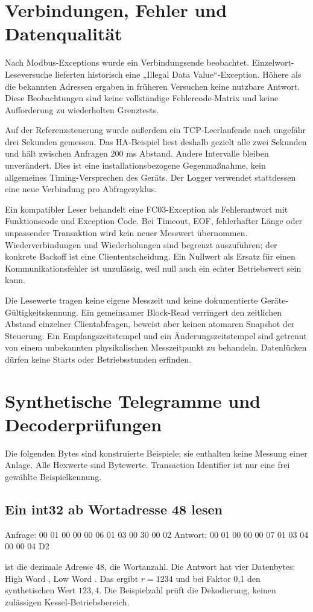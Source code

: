 \documentclass[10pt,a4paper]{article}
\begin{document}
\section{Verbindungen, Fehler und Datenqualität}
Nach Modbus-Exceptions wurde ein Verbindungsende beobachtet. Einzelwort-Leseversuche lieferten historisch eine „Illegal Data Value“-Exception. Höhere als die bekannten Adressen ergaben in früheren Versuchen keine nutzbare Antwort. Diese Beobachtungen sind keine vollständige Fehlercode-Matrix und keine Aufforderung zu wiederholten Grenztests.

Auf der Referenzsteuerung wurde außerdem ein TCP-Leerlaufende nach ungefähr drei Sekunden gemessen. Das HA-Beispiel liest deshalb gezielt  alle zwei Sekunden und hält zwischen Anfragen 200 ms Abstand. Andere Intervalle bleiben unverändert. Dies ist eine installationsbezogene Gegenmaßnahme, kein allgemeines Timing-Versprechen des Geräts. Der Logger verwendet stattdessen eine neue Verbindung pro Abfragezyklus.

Ein kompatibler Leser behandelt eine FC03-Exception als Fehlerantwort mit Funktionscode  und Exception Code. Bei Timeout, EOF, fehlerhafter Länge oder unpassender Transaktion wird kein neuer Messwert übernommen. Wiederverbindungen und Wiederholungen sind begrenzt auszuführen; der konkrete Backoff ist eine Cliententscheidung. Ein Nullwert als Ersatz für einen Kommunikationsfehler ist unzulässig, weil null auch ein echter Betriebswert sein kann.

Die Lesewerte tragen keine eigene Messzeit und keine dokumentierte Geräte-Gültigkeitskennung. Ein gemeinsamer Block-Read verringert den zeitlichen Abstand einzelner Clientabfragen, beweist aber keinen atomaren Snapshot der Steuerung. Ein Empfangszeitstempel und ein Änderungszeitstempel sind getrennt von einem unbekannten physikalischen Messzeitpunkt zu behandeln. Datenlücken dürfen keine Starts oder Betriebsstunden erfinden.

\section{Synthetische Telegramme und Decoderprüfungen}
\label{sec:vectors}
Die folgenden Bytes sind konstruierte Beispiele; sie enthalten keine Messung einer Anlage. Alle Hexwerte sind Bytewerte. Transaction Identifier  ist nur eine frei gewählte Beispielkennung.

\subsection{Ein int32 ab Wortadresse 48 lesen}
\begin{CodeBlock}
Anfrage:  00 01 00 00 00 06 01 03 00 30 00 02
Antwort:  00 01 00 00 00 07 01 03 04 00 00 04 D2
\end{CodeBlock}
 ist die dezimale Adresse 48,  die Wortanzahl. Die Antwort hat vier Datenbytes: High Word , Low Word . Das ergibt $r=1234$ und bei Faktor 0,1 den synthetischen Wert $123{,}4$. Die Beispielzahl prüft die Dekodierung, keinen zulässigen Kessel-Betriebsbereich.
\end{document}

